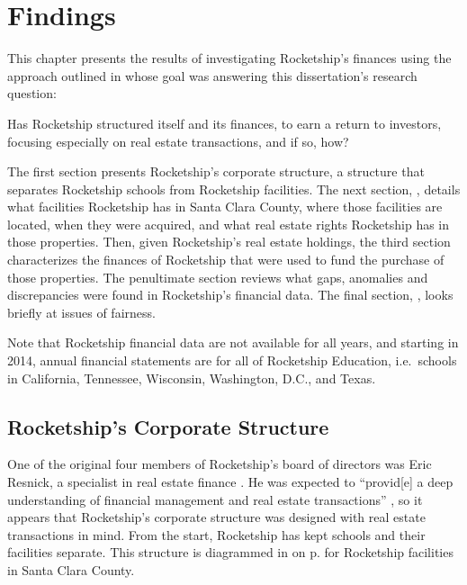 
\chapter{Findings}\label{ch:findings}%
This chapter presents the results of investigating Rocketship's finances using the approach outlined in  whose goal was answering this dissertation's research question:
\begin{displayquote}
{Has Rocketship structured itself and its finances, to earn a return to investors, focusing especially on real estate transactions, and if so, how}?
\end{displayquote}

The first section presents Rocketship's corporate structure, a structure that separates Rocketship schools from Rocketship facilities. The next section, , details what facilities Rocketship has in Santa Clara County, where those facilities are located, when they were acquired, and what real estate rights Rocketship has in those properties. Then, given Rocketship's real estate holdings, the third section characterizes the finances of Rocketship that were used to fund the purchase of those properties. The penultimate section reviews what gaps, anomalies and discrepancies were found in Rocketship's financial data. The final section, , looks briefly at issues of fairness.

Note that Rocketship financial data are not available for all years, and starting in 2014, annual financial statements are for all of Rocketship Education, i.e.\ schools in California, Tennessee, Wisconsin, Washington, D.C., and Texas.

\section{Rocketship's Corporate Structure}%
\label{sec:RSED-corporate-structure}\indent%

One of the original four members of Rocketship's board of directors was Eric Resnick, a specialist in real estate finance \parencite{MarketScreener2024}. He was expected to ``provid[e] a deep understanding of financial management and real estate transactions'' \parencite[13]{Danner2006}, so it appears that Rocketship's corporate structure was designed with real estate transactions in mind. From the start, Rocketship has kept schools and their facilities separate. This structure is diagrammed in  on p.\pageref{fig:corporate-structure} for Rocketship facilities in Santa Clara County.

